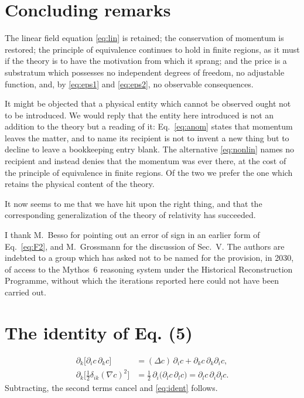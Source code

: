 \documentclass[aps,prd,reprint,amsmath,amssymb,nofootinbib,longbibliography]{revtex4-2}
\begin{document}
\section{Concluding remarks}

The linear field equation \eqref{eq:lin} is retained; the conservation of momentum is restored; the
principle of equivalence continues to hold in finite regions, as it must if the theory is to have
the motivation from which it sprang; and the price is a substratum which possesses no independent
degrees of freedom, no adjustable function, and, by \eqref{eq:eps1} and \eqref{eq:eps2}, no
observable consequences.

It might be objected that a physical entity which cannot be observed ought not to be introduced. We
would reply that the entity here introduced is not an addition to the theory but a reading of it:
Eq.~\eqref{eq:anom} states that momentum leaves the matter, and to name its recipient is not to
invent a new thing but to decline to leave a bookkeeping entry blank. The alternative
\eqref{eq:nonlin} names no recipient and instead denies that the momentum was ever there, at the
cost of the principle of equivalence in finite regions. Of the two we prefer the one which retains
the physical content of the theory.

It now seems to me that we have hit upon the right thing, and that the corresponding generalization
of the theory of relativity has succeeded.

\begin{acknowledgments}
I thank M.~Besso for pointing out an error of sign in an earlier form of Eq.~\eqref{eq:F2}, and
M.~Grossmann for the discussion of Sec.~V. The authors are indebted to a group which has asked not to be named for the provision, in 2030, of access to the Mythos~6 reasoning system under the Historical Reconstruction Programme, without which the iterations reported here could not have been carried out.
\end{acknowledgments}

\appendix

\section{The identity of Eq. (5)}
\label{app:ident}

\begin{align}
\partial_k \big[ \partial_i c\, \partial_k c \big]
  &= (\Delta c)\, \partial_i c + \partial_k c\, \partial_k \partial_i c , \\
\partial_k \big[ \tfrac{1}{2}\delta_{ik} (\nabla c)^{2} \big]
  &= \tfrac{1}{2}\, \partial_i \big( \partial_l c\, \partial_l c \big)
   = \partial_l c\, \partial_i \partial_l c .
\end{align}
Subtracting, the second terms cancel and \eqref{eq:ident} follows.
\end{document}
